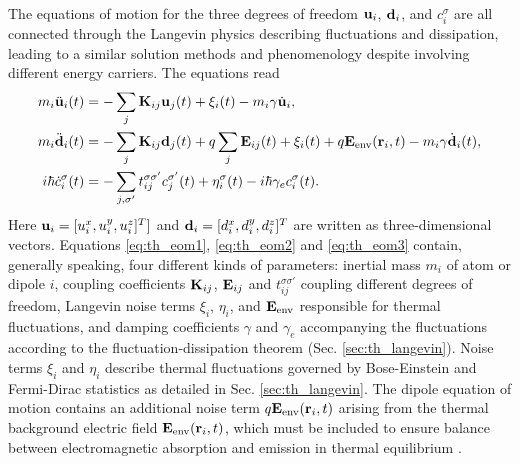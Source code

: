 The equations of motion for the three degrees of freedom $\mathbf{u}_i$, $\mathbf{d}_i$, and $c_i^{\sigma}$ are all connected through the Langevin physics describing fluctuations and dissipation, leading to a similar solution methods and phenomenology despite involving different energy carriers. The equations read  \cite{bolsterli70,rosa10,rosa11,dhar03}
\begin{subequations}
\begin{align}
 m_i \ddot{\mathbf{u}}_i(t) &=  - \sum_j \mathbf{K}_{ij}\mathbf{u}_j(t) + \xi_i(t) - m_i \gamma \dot{\mathbf{u}}_i, \label{eq:th_eom1} \\
 m_i \ddot{\mathbf{d}}_i(t) &= - \sum_j \mathbf{K}_{ij} \mathbf{d}_j(t) +q\sum_{j} \mathbf{E}_{ij}(t)+\xi_i(t)+ q\mathbf{E}_{\textrm{env}}(\mathbf{r}_i,t) - m_i \gamma \dot{\mathbf{d}}_i(t), \label{eq:th_eom2}\\
 i\hbar \dot{c}_i^{\sigma}(t) &= -\sum_{j,\sigma'} t_{ij}^{\sigma\sigma'} c_j^{\sigma'}(t) +\eta_i^{\sigma}(t) - i\hbar \gamma_e c_i^{\sigma}(t) \label{eq:th_eom3}.
\end{align}
\end{subequations}
Here $\mathbf{u}_i=[u_i^{x},u_i^y,u_i^z]^T]$ and $\mathbf{d}_i=[d_i^x,d_i^y,d_i^z]^T$ are written as three-dimensional vectors. Equations \eqref{eq:th_eom1}, \eqref{eq:th_eom2} and \eqref{eq:th_eom3} contain, generally speaking, four different kinds of parameters: inertial mass $m_i$ of atom or dipole $i$, coupling coefficients $\mathbf{K}_{ij}$, $\mathbf{E}_{ij}$ and $t_{ij}^{\sigma\sigma'}$ coupling different degrees of freedom, Langevin noise terms $\xi_i$, $\eta_i$, and $\mathbf{E}_{\textrm{env}}$ responsible for thermal fluctuations, and damping coefficients $\gamma$ and $\gamma_e$ accompanying the fluctuations according to the fluctuation-dissipation theorem (Sec. \ref{sec:th_langevin}). Noise terms $\xi_i$ and $\eta_i$ describe thermal fluctuations governed by Bose-Einstein and Fermi-Dirac statistics as detailed in Sec. \ref{sec:th_langevin}. The dipole equation of motion contains an additional noise term $q\mathbf{E}_{\textrm{env}}(\mathbf{r}_i,t)$ arising from the thermal background electric field $\mathbf{E}_{\textrm{env}}(\mathbf{r}_i,t)$, which must be included to ensure balance between electromagnetic absorption and emission in thermal equilibrium \cite{rosa10}.


